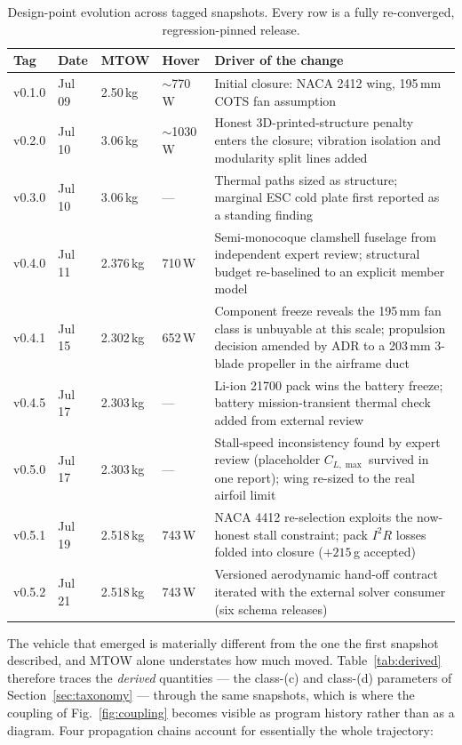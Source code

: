 \begin{table}[htbp]
\centering
\caption{Design-point evolution across tagged snapshots. Every row is
a fully re-converged, regression-pinned release.}
\label{tab:evolution}
\small
\begin{tabularx}{\textwidth}{@{}llllX@{}}
\toprule
\textbf{Tag} & \textbf{Date} & \textbf{MTOW} & \textbf{Hover} &
\textbf{Driver of the change} \\
\midrule
v0.1.0 & Jul 09 & 2.50\,kg & $\sim$770\,W &
Initial closure: NACA 2412 wing, 195\,mm COTS fan assumption \\
v0.2.0 & Jul 10 & 3.06\,kg & $\sim$1030\,W &
Honest 3D-printed-structure penalty enters the closure; vibration
isolation and modularity split lines added \\
v0.3.0 & Jul 10 & 3.06\,kg & --- &
Thermal paths sized as structure; marginal ESC cold plate first
reported as a standing finding \\
v0.4.0 & Jul 11 & 2.376\,kg & 710\,W &
Semi-monocoque clamshell fuselage from independent expert review;
structural budget re-baselined to an explicit member model \\
v0.4.1 & Jul 15 & 2.302\,kg & 652\,W &
Component freeze reveals the 195\,mm fan class is unbuyable at this
scale; propulsion decision amended by ADR to a 203\,mm 3-blade
propeller in the airframe duct \\
v0.4.5 & Jul 17 & 2.303\,kg & --- &
Li-ion 21700 pack wins the battery freeze; battery mission-transient
thermal check added from external review \\
v0.5.0 & Jul 17 & 2.303\,kg & --- &
Stall-speed inconsistency found by expert review (placeholder
$C_{L,\max}$ survived in one report); wing re-sized to the real
airfoil limit \\
v0.5.1 & Jul 19 & 2.518\,kg & 743\,W &
NACA 4412 re-selection exploits the now-honest stall constraint;
pack $I^2R$ losses folded into closure ($+215$\,g accepted) \\
v0.5.2 & Jul 21 & 2.518\,kg & 743\,W &
Versioned aerodynamic hand-off contract iterated with the external
solver consumer (six schema releases) \\
\bottomrule
\end{tabularx}
\end{table}

The vehicle that emerged is materially different from the one the first
snapshot described, and MTOW alone understates how much moved.
Table~\ref{tab:derived} therefore traces the \emph{derived} quantities
--- the class-(c) and class-(d) parameters of
Section~\ref{sec:taxonomy} --- through the same snapshots, which is
where the coupling of Fig.~\ref{fig:coupling} becomes visible as
program history rather than as a diagram. Four propagation chains
account for essentially the whole trajectory:

